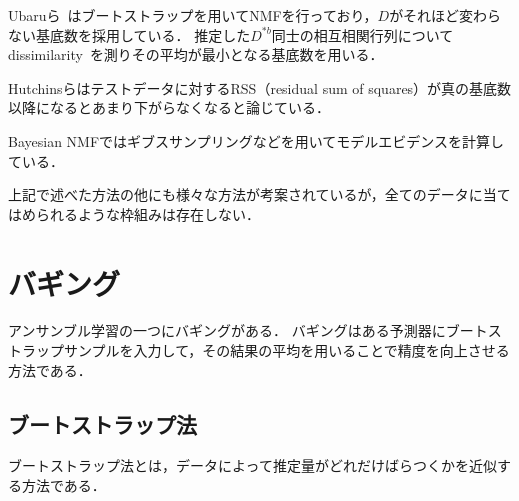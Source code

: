 Ubaruら~\cite{Ubaru2017}はブートストラップを用いてNMFを行っており，$D$がそれほど変わらない基底数を採用している．
推定した$D^{*b}$同士の相互相関行列についてdissimilarity~\cite{Wu}を測りその平均が最小となる基底数を用いる．

Hutchinsらはテストデータに対するRSS（residual sum of squares）が真の基底数以降になるとあまり下がらなくなると論じている\cite{Hutchins2008}．

Bayesian NMFではギブスサンプリングなどを用いてモデルエビデンスを計算している\cite{Cemgil2009}．

上記で述べた方法の他にも様々な方法が考案されているが，全てのデータに当てはめられるような枠組みは存在しない．


\section{バギング}
アンサンブル学習の一つにバギング\cite{Breiman1996}がある．
バギングはある予測器にブートストラップサンプルを入力して，その結果の平均を用いることで精度を向上させる方法である．

\subsection{ブートストラップ法}
ブートストラップ法\cite{Efron1979}とは，データによって推定量がどれだけばらつくかを近似する方法である．

